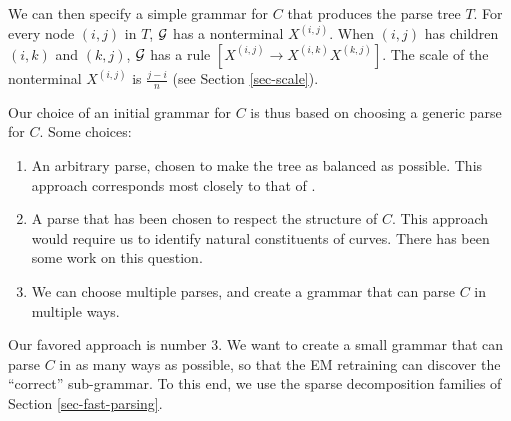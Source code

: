 We can then specify a simple grammar for $C$ that produces the parse
tree $T$. For every node $(i,j)$ in $T$, ${\mathcal G}$ has a nonterminal
$X^{(i,j)}$. When $(i,j)$ has children $(i,k)$ and $(k,j)$, ${\mathcal G}$ has
a rule $[X^{(i,j)} \to X^{(i,k)}X^{(k,j)}]$. The scale of the
nonterminal $X^{(i,j)}$ is $\frac{j-i}{n}$ (see Section \ref{sec-scale}).

Our choice of an initial grammar for $C$ is thus based on choosing a
generic parse for $C$. Some choices:
\begin{enumerate}
\item An arbitrary parse, chosen to make the tree as balanced as
  possible. This approach corresponds most closely to that of
  \cite{hcm}.
\item A parse that has been chosen to respect the structure of
  $C$. This approach would require us to identify natural constituents
  of curves. There has been some work on this question.
\item We can choose multiple parses, and create a grammar that can
  parse $C$ in multiple ways. 
\end{enumerate}

Our favored approach is number 3. We want to create a small grammar
that can parse $C$ in as many ways as possible, so that the EM
retraining can discover the ``correct'' sub-grammar. To this end, we
use the sparse decomposition families of Section
\ref{sec-fast-parsing}.




